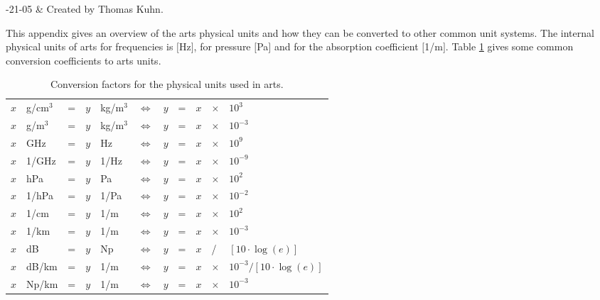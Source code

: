  \label{app:arts_units}


-21-05 & Created by Thomas Kuhn. \\
\stophistory

 This appendix gives an overview of the arts physical units 
 and how they can be converted to other common unit systems.
 The internal physical units of arts for frequencies is $[$Hz$]$,
 for pressure $[$Pa$]$ and for the absorption coefficient $[$1/m$]$.
 Table \ref{tab:app_arts_units} gives some common conversion
 coefficients to arts units.

\begin{table}[!thb]
  \begin{center}
  \begin{tabular}{lllllllllll}
   \hline
   $x$ & g/cm$^3$ & = & $y$ & kg/m$^3$ & $\Leftrightarrow$ & $y$ & = &
   $x$ & $\times$ & $10^{3}$ \\
   $x$ & g/m$^3$  & = & $y$ & kg/m$^3$ & $\Leftrightarrow$ & $y$ & = & $x$ & $\times$ & $10^{-3}$ \\
   $x$ & GHz      & = & $y$ & Hz       & $\Leftrightarrow$ & $y$ & = & $x$ & $\times$ & $ 10^{9}$ \\
   $x$ & 1/GHz    & = & $y$ & 1/Hz     & $\Leftrightarrow$ & $y$ & = & $x$ & $\times$ & $10^{-9}$ \\
   $x$ & hPa      & = & $y$ & Pa       & $\Leftrightarrow$ & $y$ & = & $x$ & $\times$ & $10^{2}$ \\
   $x$ & 1/hPa    & = & $y$ & 1/Pa     & $\Leftrightarrow$ & $y$ & = & $x$ & $\times$ & $10^{-2}$ \\
   $x$ & 1/cm     & = & $y$ & 1/m      & $\Leftrightarrow$ & $y$ & = & $x$ & $\times$ & $10^{2}$ \\
   $x$ & 1/km     & = & $y$ & 1/m      & $\Leftrightarrow$ & $y$ & = & $x$ & $\times$ & $10^{-3}$ \\
   $x$ & dB       & = & $y$ & Np       & $\Leftrightarrow$ & $y$ & = & $x$ & / & $[10\cdot\log{(e)}]$ \\
   $x$ & dB/km    & = & $y$ & 1/m      & $\Leftrightarrow$ & $y$ & = &
   $x$ & $\times$ & $10^{-3} / [10\cdot\log{(e)}]$ \\
   $x$ & Np/km    & = & $y$ & 1/m      & $\Leftrightarrow$ & $y$ & = & $x$ & $\times$ & $10^{-3}$ \\
   \hline
 \end{tabular}
 \end{center}
 \caption{Conversion factors for the physical units used in arts.}
 \label{tab:app_arts_units}
\end{table}

